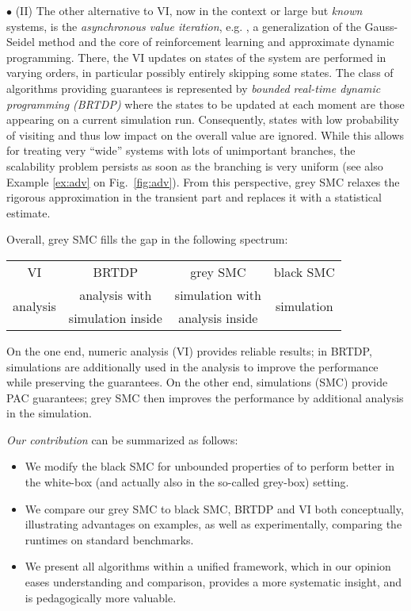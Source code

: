 $\bullet$ (II) The other alternative to VI, now in the context or large but \emph{known} systems, is the \emph{asynchronous value iteration}, e.g. \cite{10.5555/59912}, a generalization of the Gauss-Seidel method and the core of reinforcement learning and approximate dynamic programming. There, the VI updates on states of the system are performed in varying orders, in particular possibly entirely skipping some states.
The class of algorithms providing guarantees is represented by \emph{bounded real-time dynamic programming (BRTDP)} \cite{BRTDP,atva14,cav19} where the states to be updated at each moment are those appearing on a current simulation run.
Consequently, states with low probability of visiting and thus low impact on the overall value are ignored.
While this allows for treating very ``wide'' systems with lots of unimportant branches, the scalability problem persists as soon as the branching is very uniform (see also Example \ref{ex:adv} on Fig.~\ref{fig:adv}).
From this perspective, grey SMC relaxes the rigorous approximation in the transient part and replaces it with a statistical estimate.


Overall, grey SMC fills the gap in the following spectrum:

\smallskip
\begin{tabular}{|@{\hskip 5mm}c@{\hskip 9mm}c@{\hskip 9mm}c@{\hskip 9mm}c@{\hskip 5mm}|}
	\hline
	VI&BRTDP&grey SMC&black SMC\\
	\multirow {2}{*}{analysis} & analysis with   & simulation with  &  \multirow {2}{*}{simulation}\\
	&simulation inside& analysis inside &\\\hline
\end{tabular}
\smallskip

\noindent
On the one end, numeric analysis (VI) provides reliable results; in BRTDP, simulations are additionally used in the analysis to improve the performance while preserving the guarantees.
On the other end, simulations (SMC) provide PAC guarantees; grey SMC then improves the performance by additional analysis in the simulation. 


\emph{Our contribution} can be summarized as follows:
\begin{itemize}
	\item We modify the black SMC for unbounded properties of \cite{DHKPjournal} to perform better in the white-box (and actually also in the so-called grey-box) setting.
	\item We compare our grey SMC to black SMC, BRTDP and VI both conceptually, illustrating advantages on examples, as well as experimentally, comparing the runtimes on standard benchmarks.
	\item We present all algorithms within a unified framework, which in our opinion eases understanding and comparison, provides a more systematic insight, and is pedagogically more valuable.
\end{itemize}


